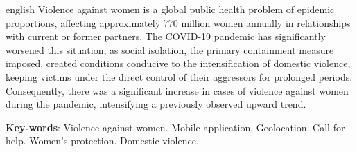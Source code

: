 \documentclass[
	12pt,				    %
	openright,			    %
	oneside,			    %
	a4paper,			    %
    sumario=tradicional,    %
	english,			    %
	brazil,				    %
	]{abntex2}              %
\begin{document}
\begin{resumo}[Abstract]
 \begin{otherlanguage*}{english}
   \noindent
Violence against women is a global public health problem of epidemic proportions, affecting approximately 770 million women annually in relationships with current or former partners. The COVID-19 pandemic has significantly worsened this situation, as social isolation, the primary containment measure imposed, created conditions conducive to the intensification of domestic violence, keeping victims under the direct control of their aggressors for prolonged periods. Consequently, there was a significant increase in cases of violence against women during the pandemic, intensifying a previously observed upward trend.

   \vspace{\onelineskip}

   \noindent
   \textbf{Key-words}: Violence against women. Mobile application. Geolocation. Call for help. Women's protection. Domestic violence.
 \end{otherlanguage*}
\end{resumo}

\listoffigures*
\cleardoublepage

\listoftables*
\cleardoublepage







\tableofcontents*
\cleardoublepage
\end{document}

